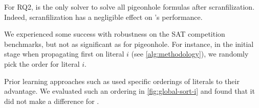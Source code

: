 For RQ2, \tool is the only solver to solve all pigeonhole formulas after
scranfilization. Indeed, scranfilization has a negligible effect on \tool's
performance.

We experienced some success with robustness on the SAT competition benchmarks,
but not as significant as for pigeonhole. For instance, in the initial stage
when propagating first on literal $i$ (see \autoref{alg:methodology}), we
randomly pick the order for literal $i$.

Prior \pr learning approaches such as \prelearn used specific orderings of
literals to their advantage. We evaluated such an ordering in
\autoref{fig:global-sort-i} and found that it did not make a difference for
\tool.

